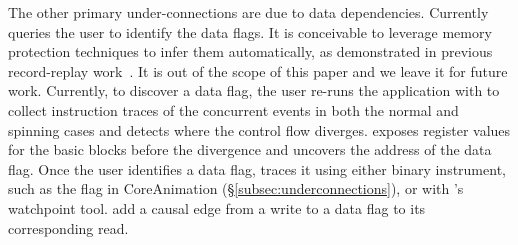 The other primary under-connections are due to data dependencies. Currently \xxx
queries the user to identify the data flags. It is conceivable to leverage
memory protection techniques to infer them automatically, as demonstrated in
previous record-replay work~\cite{king2005debugging, dunlap2008execution}. It
is out of the scope of this paper and we leave it for future work. Currently,
to discover a data flag, the user re-runs the application with \xxx to collect
instruction traces of the concurrent events in both the normal and spinning
cases and detects where the control flow diverges. \xxx exposes register
values for the basic blocks before the divergence and uncovers the address
of the data flag. Once the user identifies a data flag, \xxx traces it using
either binary instrument, such as the  flag in CoreAnimation
(\S\ref{subsec:underconnections}), or with \xxx's watchpoint tool. \xxx
add a causal edge from a write to a data flag to its corresponding read.

